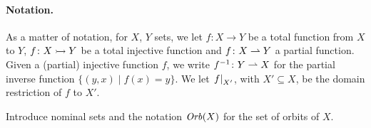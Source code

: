 \paragraph{Notation.} As a matter of notation, for $X$, $Y$ sets, we let $f \colon X \to Y$ be a total function from $X$ to $Y$, $f \colon X \rightarrowtail Y$ be a total injective function and $f \colon X \rightharpoonup Y$ a partial function. Given a (partial) injective function $f$, we write $f^{-1} \colon Y \rightharpoonup X$ for the partial inverse function $\{(y,x) \mid f(x) = y \}$. We let $\left.f\right|_{X'}$, with $X' \subseteq X$, be the domain restriction of $f$ to $X'$.

\begin{Todo}
 Introduce nominal sets and the notation $\mathit{Orb}(X)$ for the set of orbits of $X$.
\end{Todo}
